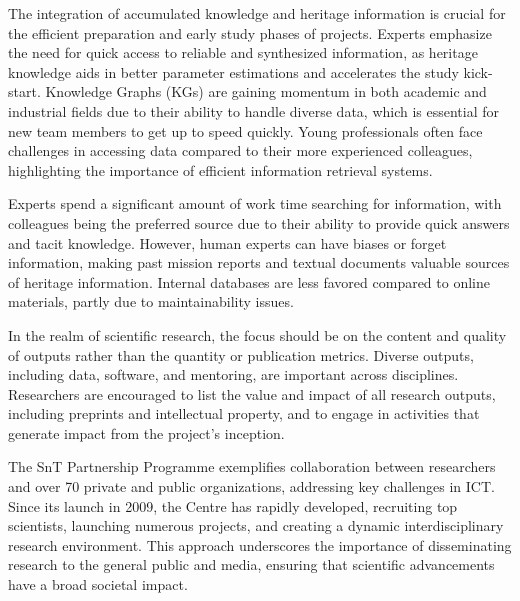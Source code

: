 \documentclass{article}
\begin{document}
The integration of accumulated knowledge and heritage information is crucial for the efficient preparation and early study phases of projects. Experts emphasize the need for quick access to reliable and synthesized information, as heritage knowledge aids in better parameter estimations and accelerates the study kick-start. Knowledge Graphs (KGs) are gaining momentum in both academic and industrial fields due to their ability to handle diverse data, which is essential for new team members to get up to speed quickly. Young professionals often face challenges in accessing data compared to their more experienced colleagues, highlighting the importance of efficient information retrieval systems.

Experts spend a significant amount of work time searching for information, with colleagues being the preferred source due to their ability to provide quick answers and tacit knowledge. However, human experts can have biases or forget information, making past mission reports and textual documents valuable sources of heritage information. Internal databases are less favored compared to online materials, partly due to maintainability issues.

In the realm of scientific research, the focus should be on the content and quality of outputs rather than the quantity or publication metrics. Diverse outputs, including data, software, and mentoring, are important across disciplines. Researchers are encouraged to list the value and impact of all research outputs, including preprints and intellectual property, and to engage in activities that generate impact from the project's inception.

The SnT Partnership Programme exemplifies collaboration between researchers and over 70 private and public organizations, addressing key challenges in ICT. Since its launch in 2009, the Centre has rapidly developed, recruiting top scientists, launching numerous projects, and creating a dynamic interdisciplinary research environment. This approach underscores the importance of disseminating research to the general public and media, ensuring that scientific advancements have a broad societal impact.
\end{document}
